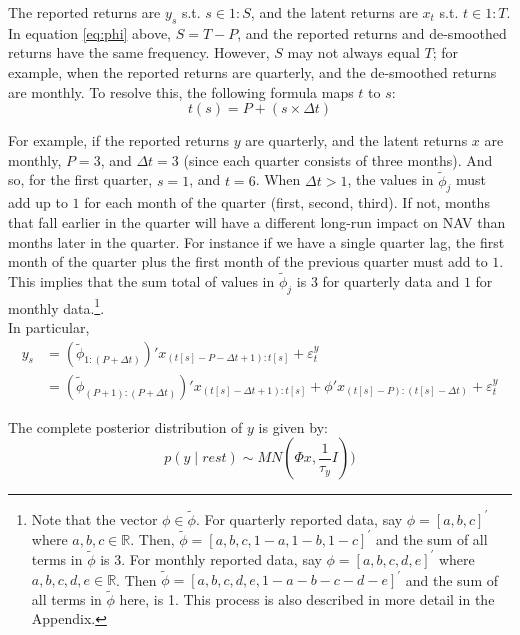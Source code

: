 \documentclass{ledger}
\begin{document}
The reported returns are $y_s$ s.t. $s \in 1:S$, and the latent returns are $x_t$ s.t. $t \in 1:T$. In equation \eqref{eq:phi} above, $S = T-P$, and the reported returns and de-smoothed returns have the same frequency. However, $S$ may not always equal $T$; for example, when the reported returns are quarterly, and the de-smoothed returns are monthly. To resolve this, the following formula maps $t$ to $s$:
\begin{equation}
	t(s) = P + (s \times \Delta t)
\end{equation}

For example, if the reported returns $y$ are quarterly, and the latent returns $x$ are monthly, $P=3$, and $\Delta t = 3$ (since each quarter consists of three months). And so, for the first quarter, $s = 1$, and $t = 6$. When $\Delta t > 1$, the values in $\tilde{\phi}_j$ must add up to $1$ for each month of the quarter (first, second, third). If not, months that fall earlier in the quarter will have a different long-run impact on NAV than months later in the quarter. For instance if we have a single quarter lag, the first month of the quarter plus the first month of the previous quarter must add to $1$. This implies that the sum total of values in $\tilde{\phi}_j$ is $3$ for quarterly data and $1$ for monthly data.\footnote{Note that the vector $\phi \in \tilde{\phi}$. For quarterly reported data, say $\phi = [a, b, c]^\prime$ where $a, b, c \in \mathbb{R}$. Then, $\tilde{\phi} = [a, b, c, 1-a, 1-b, 1-c]^\prime$ and the sum of all terms in $\tilde{\phi}$ is 3. For monthly reported data, say $\phi = [a, b, c, d, e]^\prime$ where $a, b, c, d,e \in \mathbb{R}$. Then $\tilde{\phi} = [a, b, c, d, e, 1-a-b-c-d-e]^\prime$ and the sum of all terms in $\tilde{\phi}$ here, is 1. This process is also described in more detail in the Appendix.}.  \\

In particular,
\begin{align}
	y_{s} 	&= \left(\tilde{\phi}_{1:\left(P+\Delta t\right)}\right)'x_{(t[s]-P-\Delta t+1):t[s]}+\varepsilon_{t}^{y}	\\
			&= \left(\tilde{\phi}_{\left(P+1\right):\left(P+\Delta t\right)}\right)'x_{\left(t[s]-\Delta t+1\right):t[s]}+\phi'x_{(t[s]-P):\left(t[s]-\Delta t\right)}+\varepsilon_{t}^{y}
\end{align}

The complete posterior distribution of $y$ is given by:
\begin{equation}
\label{eq:y_dist}
	p \left( y \mid rest \right) \sim MN \left( \Phi x,\frac{1}{\tau_{y}}I\right))
\end{equation}
\end{document}
